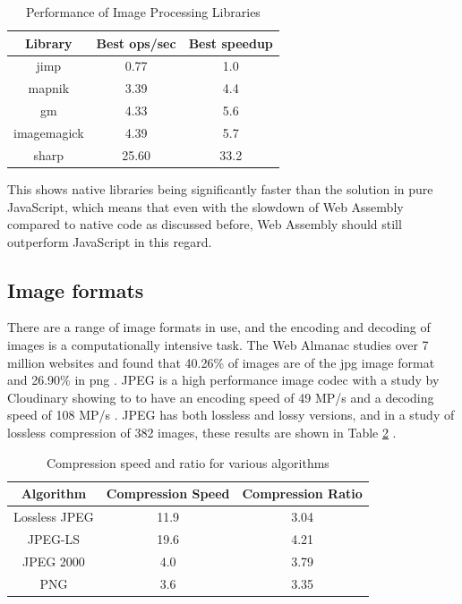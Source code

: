\documentclass[12pt,a4paper]{article}
\begin{document}
\begin{table}[htb]
    \centering
    \caption{Performance of Image Processing Libraries}
    \vspace*{6pt}
    \label{imgproc}
    \begin{tabular}{ccc}\hline\hline
        Library     & Best ops/sec & Best speedup \\ \hline
        jimp        & 0.77         & 1.0          \\
        mapnik      & 3.39         & 4.4          \\
        gm          & 4.33         & 5.6          \\
        imagemagick & 4.39         & 5.7          \\
        sharp       & 25.60        & 33.2
    \end{tabular}
\end{table}


This shows native libraries being significantly faster than the solution in pure JavaScript, which means that even with the slowdown of Web Assembly compared to native code as discussed before, Web Assembly should still outperform JavaScript in this regard.

\subsection{Image formats}

There are a range of image formats in use, and the encoding and decoding of images is a computationally intensive task. The Web Almanac studies over 7 million websites and found that 40.26\% of images are of the jpg image format and 26.90\% in png \cite{webalmanac}. JPEG is a high performance image codec with a study by Cloudinary showing to to have an encoding speed of 49 MP/s and a decoding speed of 108 MP/s \cite{cloudinary}. JPEG has both lossless and lossy versions, and in a study of lossless compression of 382 images, these results are shown in Table \ref{speedratio} \cite{ukrit2011survey}.


\begin{table}[H]
    \centering
    \caption{Compression speed and ratio for various algorithms}
    \vspace*{6pt}
    \label{speedratio}
    \begin{tabular}{ccc}\hline\hline
        Algorithm     & Compression Speed & Compression Ratio \\ \hline
        Lossless JPEG & 11.9              & 3.04              \\
        JPEG-LS       & 19.6              & 4.21              \\
        JPEG 2000     & 4.0               & 3.79              \\
        PNG           & 3.6               & 3.35              \\
    \end{tabular}
\end{table}
\end{document}
